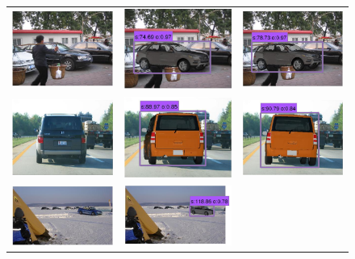 \documentclass[10pt,twocolumn,letterpaper]{article}
\begin{document}
\begin{figure}[h]
\begin{tabular}{|ccc|}
  \includegraphics[width=0.22\linewidth]{supp/tuning_3a.png} &
  \includegraphics[width=0.22\linewidth]{supp/tuning_3b.png} & 
  \includegraphics[width=0.22\linewidth]{supp/tuning_3c.png}  \\   
  \includegraphics[width=0.22\linewidth]{supp/tuning_4a.png} &
  \includegraphics[width=0.22\linewidth]{supp/tuning_4b.png} & 
  \includegraphics[width=0.22\linewidth]{supp/tuning_4c.png}  \\     
  \includegraphics[width=0.22\linewidth]{supp/tuning_5a.png} &
  \includegraphics[width=0.22\linewidth]{supp/tuning_5b.png} & 

\end{tabular}
\end{figure}
\end{document}
